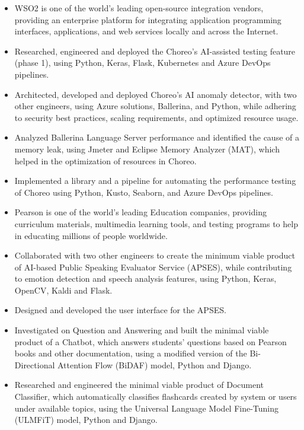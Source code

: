 \documentclass[10pt,a4paper,ragged2e,withhyper]{altacv}
\begin{document}
\begin{itemize}
    \item WSO2 is one of the world's leading open-source integration vendors, providing an enterprise platform for integrating application programming interfaces, applications, and web services locally and across the Internet.
    \item Researched, engineered and deployed the Choreo's AI-assisted testing feature (phase 1), using Python, Keras, Flask, Kubernetes and Azure DevOps pipelines.
    \item Architected, developed and deployed Choreo's AI anomaly detector, with two other engineers, using Azure solutions, Ballerina, and Python, while adhering to security best practices, scaling requirements, and optimized resource usage.
    \item Analyzed Ballerina Language Server performance and identified the cause of a memory leak, using Jmeter and Eclipse Memory Analyzer (MAT), which helped in the optimization of resources in Choreo.
    \item Implemented a library and a pipeline for automating the performance testing of Choreo using Python, Kusto, Seaborn, and Azure DevOps pipelines.
\end{itemize}

\divider{}

\begin{itemize}
    \item Pearson is one of the world's leading Education companies, providing curriculum materials, multimedia learning tools, and testing programs to help in educating millions of people worldwide.
    \item Collaborated with two other engineers to create the minimum viable product of AI-based Public Speaking Evaluator Service (APSES), while contributing to emotion detection and speech analysis features, using Python, Keras, OpenCV, Kaldi and Flask.
    \item Designed and developed the user interface for the APSES.
    \item Investigated on Question and Answering and built the minimal viable product of a Chatbot, which answers students' questions based on Pearson books and other documentation, using a modified version of the Bi-Directional Attention Flow (BiDAF) model, Python and Django.
    \item Researched and engineered the minimal viable product of Document Classifier, which automatically classifies flashcards created by system or users under available topics, using the Universal Language Model Fine-Tuning (ULMFiT) model, Python and Django.
\end{itemize}
\end{document}

